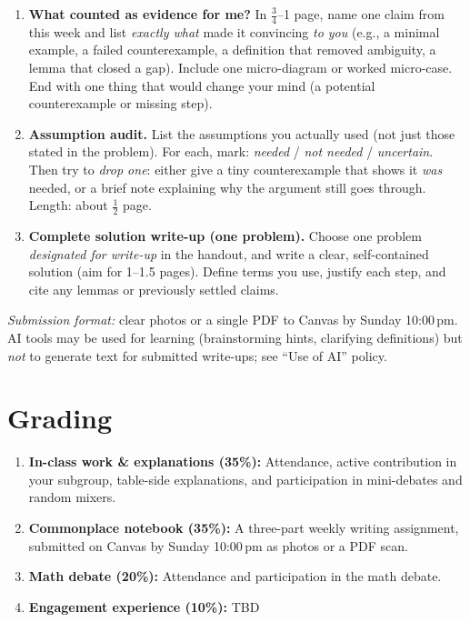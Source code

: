 \documentclass[oneside,11pt]{amsart}
\begin{document}
\begin{enumerate}[(1)]
  \item \textbf{What counted as evidence for me?}
  In $\tfrac{3}{4}$--1 page, name one claim from this week and list \emph{exactly what} made it convincing \emph{to you} (e.g., a minimal example, a failed counterexample, a definition that removed ambiguity, a lemma that closed a gap). Include one micro-diagram or worked micro-case. End with one thing that would change your mind (a potential counterexample or missing step).
  \item \textbf{Assumption audit.}
  List the assumptions you actually used (not just those stated in the problem). For each, mark: \emph{needed} / \emph{not needed} / \emph{uncertain}. Then try to \emph{drop one}: either give a tiny counterexample that shows it \emph{was} needed, or a brief note explaining why the argument still goes through. Length: about $\tfrac{1}{2}$ page.
  \item \textbf{Complete solution write-up (one problem).}
  Choose one problem \emph{designated for write-up} in the handout, and write a clear, self-contained solution (aim for 1--1.5 pages). Define terms you use, justify each step, and cite any lemmas or previously settled claims.
\end{enumerate}
\emph{Submission format:} clear photos or a single PDF to Canvas by Sunday 10:00\,pm. AI tools may be used for learning (brainstorming hints, clarifying definitions) but \emph{not} to generate text for submitted write-ups; see ``Use of AI'' policy.


\section{Grading}

\begin{enumerate}[$\bullet$]
  \item \textbf{In-class work \& explanations (35\%):}
	Attendance,
	active contribution in your subgroup, table-side explanations, 
	and participation in mini-debates and random mixers.
 
 \item \textbf{Commonplace notebook (35\%):}
	A three-part weekly writing assignment, submitted
	on Canvas by Sunday 10:00\,pm as photos or a PDF scan. 

  \item \textbf{Math debate (20\%):}
	Attendance and participation in the math debate.

	\item \textbf{Engagement experience (10\%):}
  TBD
\end{enumerate}
\end{document}
